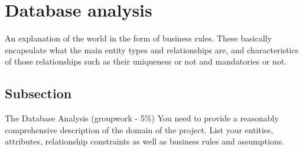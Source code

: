 \section{Database analysis}\label{Section label}
An explanation of the world in the form of business rules. These basically encapsulate what the main entity types and relationships are, and characteristics of those relationships such as their uniqueness or not and mandatories or not.

\subsection{Subsection}\label{subsection}
The Database Analysis (groupwork - 5\%) \newline
You need to provide a reasonably comprehensive description of the domain of the project. List your entities, attributes, relationship constraints as well as business rules and assumptions.
